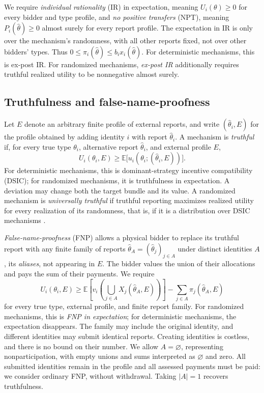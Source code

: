 \documentclass[format=acmsmall, review=false]{acmart}
\begin{document}
We require \emph{individual rationality} (IR) in expectation,
meaning $U_i(\theta)\ge0$ for every bidder and type profile, and
\emph{no positive transfers} (NPT), meaning
$P_i(\hat\theta)\ge0$ almost surely for every report profile.
The expectation in IR is only over the mechanism's randomness,
with all other reports fixed, not over other bidders' types.
Thus $0\le\pi_i(\hat\theta)\le b_i x_i(\hat\theta)$.
For deterministic mechanisms, this is ex-post IR. For randomized
mechanisms, \emph{ex-post IR} additionally requires truthful
realized utility to be nonnegative almost surely.

\subsection{Truthfulness and false-name-proofness}

Let $E$ denote an arbitrary finite profile of external reports,
and write $(\hat\theta_i,E)$ for the profile obtained by adding
identity $i$ with report $\hat\theta_i$. A mechanism is
\emph{truthful} if, for every true type $\theta_i$, alternative
report $\hat\theta_i$, and external profile $E$,
\[
U_i(\theta_i,E)
\ge
\mathbb{E}\bigl[u_i(\theta_i;(\hat\theta_i,E))\bigr].
\]
For deterministic mechanisms, this is dominant-strategy
incentive compatibility (DSIC); for randomized mechanisms, it is
truthfulness in expectation. A deviation may change both the
target bundle and its value. A randomized mechanism is
\emph{universally truthful} if truthful reporting maximizes
realized utility for every realization of its randomness, that
is, if it is a distribution over DSIC mechanisms
\citep{dobzinski2006truthful}.

\emph{False-name-proofness} (FNP) \citep{yokoo2004effect} allows a
physical bidder to
replace its truthful report with any finite family of reports
$\hat\theta_A=(\hat\theta_j)_{j\in A}$ under distinct identities
$A$, its \emph{aliases}, not appearing in
$E$. The bidder values the union of their allocations and pays
the sum of their payments. We require
\[
U_i(\theta_i,E)
\ge
\mathbb{E}\!\left[
  v_i\!\left(\bigcup_{j\in A}X_j(\hat\theta_A,E)\right)
\right]
-\sum_{j\in A}\pi_j(\hat\theta_A,E)
\]
for every true type, external profile, and finite report family.
For randomized mechanisms, this is \emph{FNP in expectation};
for deterministic mechanisms, the expectation disappears.
The family may include the original identity, and different
identities may submit identical reports. Creating identities
is costless, and there is no bound on their number. We allow
$A=\varnothing$, representing nonparticipation, with empty unions
and sums interpreted as $\varnothing$ and zero. All submitted
identities remain in the profile and all assessed payments must
be paid: we consider ordinary FNP, without withdrawal. Taking
$|A|=1$ recovers truthfulness.
\end{document}
